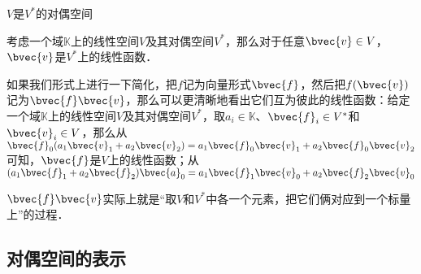 \begin{theorem}{$V$是$V^*$的对偶空间}

考虑一个域$\mathbb{K}$上的线性空间$V$及其对偶空间$V^*$，那么对于任意$\bvec{v}\in V$，$\bvec{v}$是$V^*$上的线性函数．

\end{theorem}

如果我们形式上进行一下简化，把$f$记为向量形式$\bvec{f}$，然后把$f(\bvec{v})$记为$\bvec{f}\bvec{v}$，那么可以更清晰地看出它们互为彼此的线性函数：给定一个域$\mathbb{K}$上的线性空间$V$及其对偶空间$V^*$，取$a_i\in\mathbb{K}$、$\bvec{f}_i\in V^*$和$\bvec{v}_i\in V$，那么从$\bvec{f}_0(a_1\bvec{v}_1+a_2\bvec{v}_2)=a_1\bvec{f}_0\bvec{v}_1+a_2\bvec{f}_0\bvec{v}_2$可知，$\bvec{f}$是$V$上的线性函数；从$(a_1\bvec{f}_1+a_2\bvec{f}_2)\bvec{a}_0=a_1\bvec{f}_1\bvec{v}_0+a_2\bvec{f}_2\bvec{v}_0$

$\bvec{f}\bvec{v}$实际上就是“取$V$和$V^*$中各一个元素，把它们俩对应到一个标量上”的过程．


\subsection{对偶空间的表示}%








